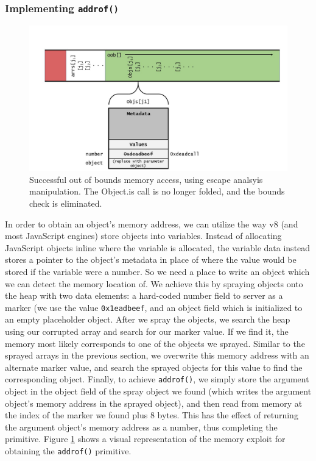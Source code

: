 \documentclass[11pt]{article}
\begin{document}
\subsubsection{Implementing \texttt{addrof()}}
\begin{figure}
	\centering
	\includegraphics[width=\linewidth]{addrof.jpg}
	\caption{Successful out of bounds memory access, using escape analsyis manipulation. The
	Object.is call is no longer folded, and the bounds check is eliminated.}
  \label{fig:addrof}
\end{figure}
In order to obtain an object's memory address, we can utilize the way v8 (and most JavaScript
engines) store objects into variables. Instead of allocating JavaScript objects inline where the
variable is allocated, the variable data instead stores a pointer to the object's metadata in place
of where the value would be stored if the variable were a number. So we need a place to write an
object which we can detect the memory location of. We achieve this by spraying objects onto the heap
with two data elements: a hard-coded number field to server as a marker (we use the value
\texttt{0x1eadbeef}, and an object field which is initialized to an empty placeholder object. After
we spray the objects, we search the heap using our corrupted array and search for our marker value.
If we find it, the memory most likely corresponds to one of the objects we sprayed. Similar to the
sprayed arrays in the previous section, we overwrite this memory address with an alternate marker
value, and search the sprayed objects for this value to find the corresponding object. Finally, to
achieve \texttt{addrof()}, we simply store the argument object in the object field of the spray
object we found (which writes the argument object's memory address in the sprayed object), and then
read from memory at the index of the marker we found plus 8 bytes. This has the effect of returning
the argument object's memory address as a number, thus completing the primitive.  Figure
\ref{fig:addrof} shows a visual representation of the memory exploit for obtaining the
\texttt{addrof()} primitive.
\end{document}
